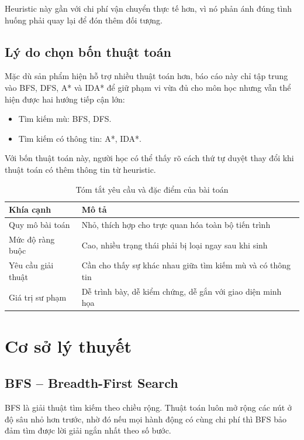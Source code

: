 \documentclass[a4paper,12pt]{article}
\begin{document}
Heuristic này gần với chi phí vận chuyển thực tế hơn, vì nó phản ánh đúng tình huống phải quay lại để đón thêm đối tượng.

\subsection{Lý do chọn bốn thuật toán}

Mặc dù sản phẩm hiện hỗ trợ nhiều thuật toán hơn, báo cáo này chỉ tập trung vào BFS, DFS, A* và IDA* để giữ phạm vi vừa đủ cho môn học nhưng vẫn thể hiện được hai hướng tiếp cận lớn:
\begin{itemize}
    \item Tìm kiếm mù: BFS, DFS.
    \item Tìm kiếm có thông tin: A*, IDA*.
\end{itemize}

Với bốn thuật toán này, người học có thể thấy rõ cách thứ tự duyệt thay đổi khi thuật toán có thêm thông tin từ heuristic.

\begin{table}[H]
\centering
\caption{Tóm tắt yêu cầu và đặc điểm của bài toán}
\begin{tabular}{@{}p{5cm}p{9cm}@{}}
\toprule
\textbf{Khía cạnh} & \textbf{Mô tả} \\
\midrule
Quy mô bài toán & Nhỏ, thích hợp cho trực quan hóa toàn bộ tiến trình \\
Mức độ ràng buộc & Cao, nhiều trạng thái phải bị loại ngay sau khi sinh \\
Yêu cầu giải thuật & Cần cho thấy sự khác nhau giữa tìm kiếm mù và có thông tin \\
Giá trị sư phạm & Dễ trình bày, dễ kiểm chứng, dễ gắn với giao diện minh họa \\
\bottomrule
\end{tabular}
\end{table}

\section{Cơ sở lý thuyết}

\subsection{BFS -- Breadth-First Search}

BFS là giải thuật tìm kiếm theo chiều rộng. Thuật toán luôn mở rộng các nút ở độ sâu nhỏ hơn trước, nhờ đó nếu mọi hành động có cùng chi phí thì BFS bảo đảm tìm được lời giải ngắn nhất theo số bước.
\end{document}
